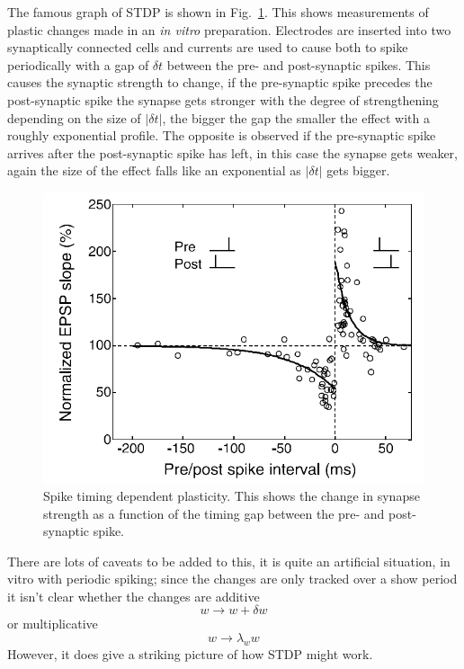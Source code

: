 \documentclass[11pt,a4paper]{scrartcl}
\begin{document}
The famous graph of STDP is shown in
Fig.~\ref{fig:BiPoo}. This shows measurements of plastic changes made
in an \textsl{in vitro} preparation. Electrodes are inserted into two
synaptically connected cells and currents are used to cause both to
spike periodically with a gap of $\delta t$ between the pre- and
post-synaptic spikes. This causes the synaptic strength to change, if
the pre-synaptic spike precedes the post-synaptic spike the synapse
gets stronger with the degree of strengthening depending on the size
of $|\delta t|$, the bigger the gap the smaller the effect with a
roughly exponential profile. The opposite is observed if the
pre-synaptic spike arrives after the post-synaptic spike has left, in
this case the synapse gets weaker, again the size of the effect falls
like an exponential as $|\delta t|$ gets bigger.


\begin{figure}
\begin{center}
\includegraphics[width=12cm]{DanPoo2004.jpg}
\end{center}
\caption{Spike timing dependent plasticity. This shows the change in
  synapse strength as a function of the timing gap between the pre-
  and post-synaptic spike. \label{fig:BiPoo}}
\end{figure}

There are lots of caveats to be added to this, it is quite an
artificial situation, in vitro with periodic spiking; since the
changes are only tracked over a show period it isn't clear whether the
changes are additive
\begin{equation}
w\rightarrow w+\delta w
\end{equation}
or multiplicative
\begin{equation}
w\rightarrow \lambda_w w
\end{equation}
However, it does give a striking picture of how STDP might work. 
\end{document}
